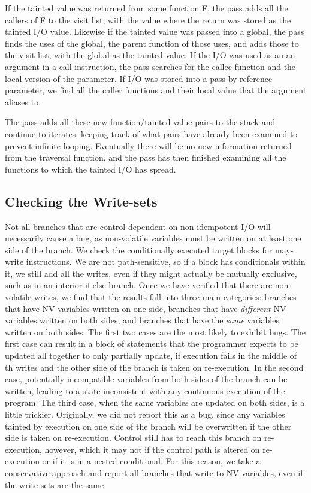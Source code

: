 If the tainted value was returned from some function F, the pass adds all the callers of F to the visit list, with the value where the return was stored as the tainted I/O value. Likewise if the tainted value was passed into a global, the pass finds the uses of the global, the parent function of those uses, and adds those to the visit list, with the global as the tainted value. If the I/O was used as an an argument in a call instruction, the pass searches for the callee function and the local version of the parameter. If I/O was stored into a pass-by-reference parameter, we find all the caller functions and their local value that the argument aliases to. 
	
The pass adds all these new function/tainted value pairs to the stack and continue to iterates, keeping track of what pairs have already been examined to prevent infinite looping. Eventually there will be no new information returned from the traversal function, and the pass has then finished examining all the functions to which the tainted I/O has spread. 
	
\subsection{Checking the Write-sets}
Not all branches that are control dependent on non-idempotent I/O will necessarily cause a bug, as non-volatile variables must be written on at least one side of the branch. We check the conditionally executed target blocks for may-write instructions. We are not path-sensitive, so if a block has conditionals within it, we still add all the writes, even if they might actually be mutually exclusive, such as in an interior if-else branch. Once we have verified that there are non-volatile writes, we find that the results fall into three main categories: branches that have NV variables written on one side, branches that have \emph{different} NV variables written on both sides, and branches that have the \emph{same} variables written on both sides. The first two cases are the most likely to exhibit bugs. The first case can result in a block of statements that the programmer expects to be updated all together to only partially update, if execution fails in the middle of th writes and the other side of the branch is taken on re-execution. In the second case, potentially incompatible variables from both sides of the branch can be written, leading to a state inconsistent with any continuous execution of the program.  The third case, when the same variables are updated on both sides, is a little trickier. Originally, we did not report this as a bug, since any variables tainted by execution on one side of the branch will be overwritten if the other side is taken on re-execution. Control still has to reach this branch on re-execution, however, which it may not if the control path is altered on re-execution or if it is in a nested conditional. For this reason, we take a conservative approach and report all branches that write to NV variables, even if the write sets are the same. 

